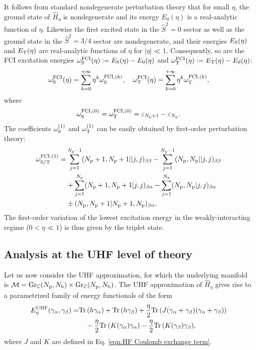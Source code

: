 \documentclass[11pt]{article}
\def\tr{{\rm Tr \,}}
\def\C{{\mathbb C}}
\begin{document}
It follows from standard nondegenerate perturbation theory that for small $\eta$, the ground state of $\widehat H_\eta$ is nondegenerate and its energy $E_0(\eta)$ is a real-analytic function of $\eta$. Likewise the  first excited state in the $\hat{S}^2=0$ sector as well as the ground state in the $\hat{S}^2=3/4$ sector are nondegenerate, and their energies $E_{\rm S}(\eta)$ and $E_{\rm T}(\eta)$ are real-analytic functions of $\eta$ for $|\eta| \ll 1$. Consequently, so are the FCI excitation energies $\omega_{\rm S}^{\rm FCI}(\eta) := E_{\rm S}(\eta)- E_0(\eta)$ and $\omega_{\rm T}^{\rm FCI}(\eta) := E_{\rm T}(\eta)- E_0(\eta)$:
$$
\omega_{\rm S}^{\rm FCI}(\eta) = \sum_{k=0}^{+\infty} \eta^k \omega^{{\rm FCI},(k)}_{\rm S}, \quad \omega_{\rm T}^{\rm FCI}(\eta) = \sum_{k=0}^{+\infty} \eta^k \omega^{{\rm FCI},(k)}_{\rm T},
$$
where
$$
\omega^{{\rm FCI},(0)}_{\rm S}=\omega^{{\rm FCI},(0)}_{\rm T}= \varepsilon_{N_{\rm p}+1} - \varepsilon_{N_{\rm p}}.
$$
The coefficients $\omega^{(1)}_{\rm S}$ and $\omega^{(1)}_{\rm T}$ can be easily obtained by first-order perturbation theory:
\begin{align}
\omega^{{\rm FCI},(1)}_{\rm S/T}=&\sum_{j=1}^{N_{\rm p}-1}(N_{\rm p}+1,N_{\rm p}+1||j,j)_{\beta\beta}-\sum_{j=1}^{N_{\rm p}-1}(N_{\rm p},N_{\rm p}||j,j)_{\beta\beta} \nonumber \\
& +\sum_{j=1}^{N_{\rm p}}(N_{\rm p}+1,N_{\rm p}+1|j,j)_{\beta\alpha}\nonumber
-\sum_{j=1}^{N_{\rm p}}(N_{\rm p},N_{\rm p}|j,j)_{\beta\alpha} \\
& \pm (N_{\rm p},N_{\rm p}+1|N_{\rm p}+1, N_{\rm p})_{\beta\alpha}.\label{eqn:FCI_excitation_energy}
\end{align}
The first-order variation of the lowest excitation energy in the weakly-interacting regime ($0<\eta\ll1$) is thus given by the triplet state. 

\subsection{Analysis at the UHF level of theory}
\label{subsec:CP-LR-HF}

Let us now consider the UHF approximation, for which the underlying manifold is $\mathcal M={\rm Gr}_\C(N_{\rm p},N_{\rm b}) \times {\rm Gr}_\C(N_{\rm p},N_{\rm b})$. The UHF approximation of $\widehat H_\eta$ gives rise to a parametrized family of energy functionals of the form
\begin{align}
\label{eqn:HF energy functional}
 E^{\rm UHF}_\eta(\gamma_\alpha,\gamma_\beta) =& \tr(h\gamma_\alpha) + \tr(h\gamma_\beta) + \frac{\eta}2 \tr(J(\gamma_\alpha+\gamma_\beta)(\gamma_\alpha+\gamma_\beta)) \nonumber \\ & \quad -  \frac{\eta}2 \tr(K(\gamma_\alpha)\gamma_\alpha) -  \frac{\eta}2 \tr(K(\gamma_\beta)\gamma_\beta),
\end{align}
where $J$ and $K$ are defined in Eq. \eqref{eqn:HF Coulomb exchange term}.
\end{document}
